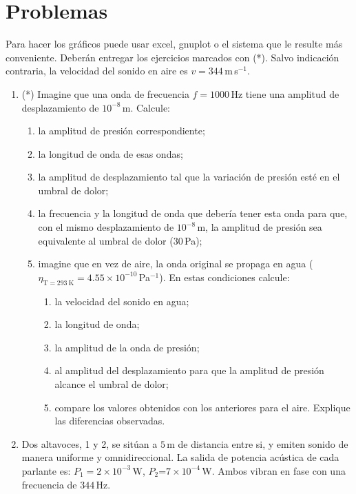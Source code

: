 \documentclass[a4paper,12pt]{article}
\begin{document}
\section{Problemas}

Para hacer los gráficos puede usar excel, gnuplot o el sistema que le
resulte más conveniente. Deberán entregar los ejercicios marcados con
(*). Salvo indicación contraria, la velocidad del sonido en aire es
$v=344$\,m\,s$^{-1}$.

\begin{enumerate}
	\item (*) Imagine que una onda de frecuencia $f=1000$\,Hz tiene una
		amplitud de desplazamiento de $10^{-8}$\,m. Calcule: 
		\begin{enumerate}
			\item la amplitud de presión correspondiente;
			\item la longitud de onda de esas ondas;
			\item la amplitud de desplazamiento tal que la variación de
				presión esté en el umbral de dolor;
			\item la frecuencia y la longitud de onda que debería tener
				esta onda para que, con el mismo desplazamiento de
				$10^{-8}$\,m, la amplitud de presión sea equivalente al
				umbral de dolor ($30$\,Pa);
			\item imagine que en vez de aire, la onda original se
				propaga en agua ($\eta_{\mathrm{T}=293\mathrm{\
				K}}=4.55\times10^{-10}$\,Pa$^{-1}$). En estas
				condiciones calcule:
				\begin{enumerate}
					\item la velocidad del sonido en agua;
					\item la longitud de onda;
					\item la amplitud de la onda de presión;
					\item al amplitud del desplazamiento para que la
						amplitud de presión alcance el umbral de dolor;
					\item compare los valores obtenidos con los
						anteriores para el aire. Explique las
						diferencias observadas.
				\end{enumerate}
		\end{enumerate}
\item Dos altavoces, 1 y 2, se sitúan a $5$\,m de distancia entre si, y emiten sonido de manera uniforme y omnidireccional. La salida de potencia acústica de cada parlante es: $P_1=2\times 10^{-3}$\,W, $P_2$=$7 \times 10^{-4}$\,W. Ambos vibran en fase con una frecuencia de $344$\,Hz.

\end{enumerate}
\end{document}
